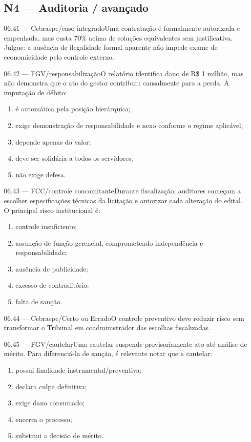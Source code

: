 \subsection*{N4 — Auditoria / avançado}
\begin{questao}{ 06.41 — Cebraspe/caso integrado}Uma contratação é formalmente autorizada e empenhada, mas custa 70\% acima de soluções equivalentes sem justificativa. Julgue: a ausência de ilegalidade formal aparente não impede exame de economicidade pelo controle externo.\end{questao}
\begin{questao}{ 06.42 — FGV/responsabilização}O relatório identifica dano de R\$ 1 milhão, mas não demonstra que o ato do gestor contribuiu causalmente para a perda. A imputação de débito:\begin{enumerate}[label=\Alph*)]\item é automática pela posição hierárquica;\item exige demonstração de responsabilidade e nexo conforme o regime aplicável;\item depende apenas do valor;\item deve ser solidária a todos os servidores;\item não exige defesa.\end{enumerate}\end{questao}
\begin{questao}{ 06.43 — FCC/controle concomitante}Durante fiscalização, auditores começam a escolher especificações técnicas da licitação e autorizar cada alteração do edital. O principal risco institucional é:\begin{enumerate}[label=\Alph*)]\item controle insuficiente;\item assunção de função gerencial, comprometendo independência e responsabilidade;\item ausência de publicidade;\item excesso de contraditório;\item falta de sanção.\end{enumerate}\end{questao}
\begin{questao}{ 06.44 — Cebraspe/Certo ou Errado}O controle preventivo deve reduzir risco sem transformar o Tribunal em coadministrador das escolhas fiscalizadas.\end{questao}
\begin{questao}{ 06.45 — FGV/cautelar}Uma cautelar suspende provisoriamente ato até análise de mérito. Para diferenciá-la de sanção, é relevante notar que a cautelar:\begin{enumerate}[label=\Alph*)]\item possui finalidade instrumental/preventiva;\item declara culpa definitiva;\item exige dano consumado;\item encerra o processo;\item substitui a decisão de mérito.\end{enumerate}\end{questao}
